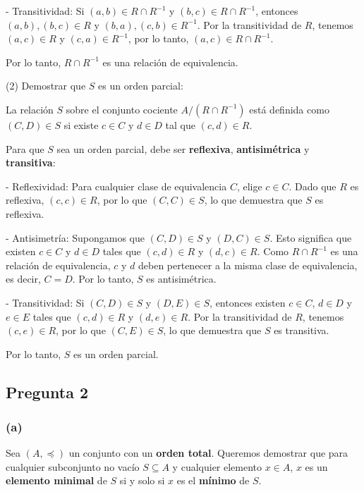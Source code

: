 \documentclass[12pt]{article}
\begin{document}
- Transitividad: Si \((a, b) \in R \cap R^{-1}\) y \((b, c) \in R \cap R^{-1}\), entonces \((a, b), (b, c) \in R\) y \((b, a), (c, b) \in R^{-1}\). Por la transitividad de \(R\), tenemos \((a, c) \in R\) y \((c, a) \in R^{-1}\), por lo tanto, \((a, c) \in R \cap R^{-1}\).

Por lo tanto, \(R \cap R^{-1}\) es una relación de equivalencia.

(2) Demostrar que \(S\) es un orden parcial:

La relación \(S\) sobre el conjunto cociente \(A / (R \cap R^{-1})\) está definida como \((C, D) \in S\) si existe \(c \in C\) y \(d \in D\) tal que \((c, d) \in R\).

Para que \(S\) sea un orden parcial, debe ser \textbf{reflexiva}, \textbf{antisimétrica} y \textbf{transitiva}:

- Reflexividad: Para cualquier clase de equivalencia \(C\), elige \(c \in C\). Dado que \(R\) es reflexiva, \((c, c) \in R\), por lo que \((C, C) \in S\), lo que demuestra que \(S\) es reflexiva.

- Antisimetría: Supongamos que \((C, D) \in S\) y \((D, C) \in S\). Esto significa que existen \(c \in C\) y \(d \in D\) tales que \((c, d) \in R\) y \((d, c) \in R\). Como \(R \cap R^{-1}\) es una relación de equivalencia, \(c\) y \(d\) deben pertenecer a la misma clase de equivalencia, es decir, \(C = D\). Por lo tanto, \(S\) es antisimétrica.

- Transitividad: Si \((C, D) \in S\) y \((D, E) \in S\), entonces existen \(c \in C\), \(d \in D\) y \(e \in E\) tales que \((c, d) \in R\) y \((d, e) \in R\). Por la transitividad de \(R\), tenemos \((c, e) \in R\), por lo que \((C, E) \in S\), lo que demuestra que \(S\) es transitiva.

Por lo tanto, \(S\) es un orden parcial.


\newpage

\subsection*{Pregunta 2}

\subsubsection*{(a)}

Sea \((A, \preceq)\) un conjunto con un \textbf{orden total}. Queremos demostrar que para cualquier subconjunto no vacío \(S \subseteq A\) y cualquier elemento \(x \in A\), \(x\) es un \textbf{elemento minimal} de \(S\) si y solo si \(x\) es el \textbf{mínimo} de \(S\).
\end{document}
